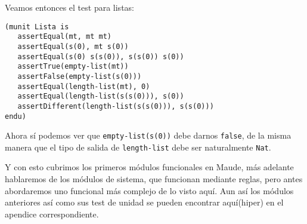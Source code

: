 Veamos entonces el test para listas: \par

\begin{verbatim}
(munit Lista is
   assertEqual(mt, mt mt)
   assertEqual(s(0), mt s(0))
   assertEqual(s(0) s(s(0)), s(s(0)) s(0))
   assertTrue(empty-list(mt))
   assertFalse(empty-list(s(0)))
   assertEqual(length-list(mt), 0)
   assertEqual(length-list(s(s(0))), s(0))
   assertDifferent(length-list(s(s(0))), s(s(0)))
endu)
\end{verbatim}

Ahora sí podemos ver que \verb"empty-list(s(0))" debe darnos \texttt{false}, de la misma manera que el tipo de salida de \verb"length-list" debe ser naturalmente \texttt{Nat}.\par 

Y con esto cubrimos los primeros módulos funcionales en Maude, más adelante hablaremos de los módulos de sistema, que funcionan mediante reglas, pero antes abordaremos uno funcional más complejo de lo visto aquí. Aun así los módulos anteriores así como sus test de unidad se pueden encontrar aquí(hiper) en el apendice correspondiente.\par 


